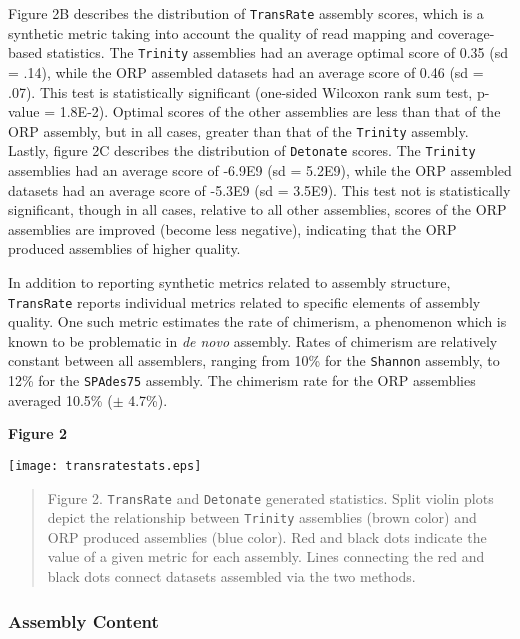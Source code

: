 \documentclass[10pt,letterpaper]{article}
\newcommand{\tit}{\textit}
\begin{document}
Figure 2B describes the distribution of \texttt{TransRate} assembly scores, which is a synthetic metric taking into account the quality of read mapping and coverage-based statistics. The \texttt{Trinity} assemblies had an average optimal score of 0.35 (sd = .14), while the ORP assembled datasets had an average score of 0.46 (sd = .07). This test is statistically significant (one-sided Wilcoxon rank sum test, p-value = 1.8E-2). Optimal scores of the other assemblies are less than that of the ORP assembly, but in all cases, greater than that of the \texttt{Trinity} assembly. Lastly, figure 2C describes the distribution of \texttt{Detonate} scores. The \texttt{Trinity} assemblies had an average score of -6.9E9 (sd = 5.2E9), while the ORP assembled datasets had an average score of -5.3E9 (sd = 3.5E9). This test not is statistically significant, though in all cases, relative to all other assemblies, scores of the ORP assemblies are improved (become less negative), indicating that the ORP produced assemblies of higher quality. 

In addition to reporting synthetic metrics related to assembly structure, \texttt{TransRate} reports individual metrics related to specific elements of assembly quality. One such metric estimates the rate of chimerism, a phenomenon which is known to be problematic in \tit{de novo} assembly. Rates of chimerism are relatively constant between all assemblers, ranging from 10\% for the \texttt{Shannon} assembly, to 12\% for the \texttt{SPAdes75} assembly. The chimerism rate for the ORP assemblies averaged 10.5\% ($\pm$ 4.7\%).

\newpage

\textbf{\hypertarget{Figure 2}{Figure 2}} \\
\centerline{\texttt{[image: transratestats.eps]}}
\begin{quote}
\small{Figure 2. \texttt{TransRate} and \texttt{Detonate} generated statistics. Split violin plots depict the relationship between \texttt{Trinity} assemblies (brown color) and ORP produced assemblies (blue color). Red and black dots indicate the value of a given metric for each assembly. Lines connecting the red and black dots connect datasets assembled via the two methods.}
\end{quote} 

\subsubsection{Assembly Content}
\end{document}
